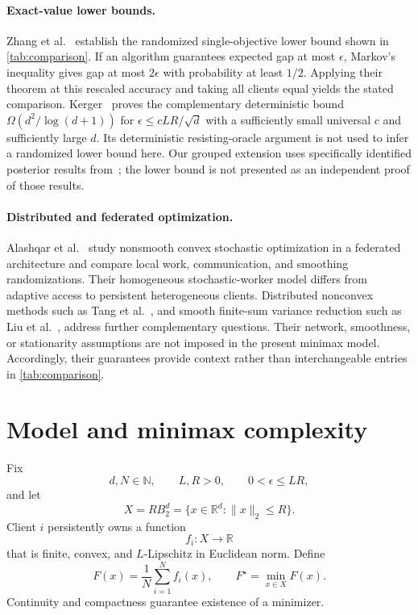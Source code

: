 \documentclass[11pt]{article}
\numberwithin{equation}{section}
\theoremstyle{remark}
\theoremstyle{definition}
\newcommand{\R}{\mathbb{R}}
\newcommand{\Ball}{B_2}
\newcommand{\norm}[1]{\lVert #1\rVert_2}
\newcommand{\eps}{\epsilon}
\begin{document}
\paragraph{Exact-value lower bounds.}
Zhang et al.~\cite[Theorem 6]{zzql2026} establish the randomized
single-objective lower bound shown in \cref{tab:comparison}. If an
algorithm guarantees expected gap at most $\eps$, Markov's inequality
gives gap at most $2\eps$ with probability at least $1/2$. Applying their
theorem at this rescaled accuracy and taking all clients equal yields
the stated comparison. Kerger~\cite[Theorem 4]{kerger2026} proves the
complementary deterministic bound $\Omega(d^2/\log(d+1))$ for
$\eps\le cLR/\sqrt d$ with a sufficiently small universal $c$ and
sufficiently large $d$. Its deterministic resisting-oracle argument is
not used to infer a randomized lower bound here. Our grouped extension
uses specifically identified posterior results from~\cite{zzql2026};
the lower bound is not presented as an independent proof of those results.

\paragraph{Distributed and federated optimization.}
Alashqar et al.~\cite{alashqar2023} study nonsmooth convex stochastic
optimization in a federated architecture and compare local work,
communication, and smoothing randomizations. Their homogeneous
stochastic-worker model differs from adaptive access to persistent
heterogeneous clients. Distributed nonconvex methods such as
Tang et al.~\cite{tang2019}, and smooth finite-sum variance reduction
such as Liu et al.~\cite{liu2018}, address further complementary
questions. Their network, smoothness, or stationarity assumptions are
not imposed in the present minimax model. Accordingly, their guarantees
provide context rather than interchangeable entries in
\cref{tab:comparison}.

\section{Model and minimax complexity}
\label{sec:model}

Fix
\[
d,N\in\mathbb N,\qquad L,R>0,\qquad 0<\eps\le LR,
\]
and let
\[
X=R\Ball^d=\{x\in\R^d:\norm{x}\le R\}.
\]
Client $i$ persistently owns a function
\[
f_i:X\to\R
\]
that is finite, convex, and $L$-Lipschitz in Euclidean norm.  Define
\[
F(x)=\frac1N\sum_{i=1}^N f_i(x),
\qquad
F^\star=\min_{x\in X}F(x).
\]
Continuity and compactness guarantee existence of a minimizer.
\end{document}
